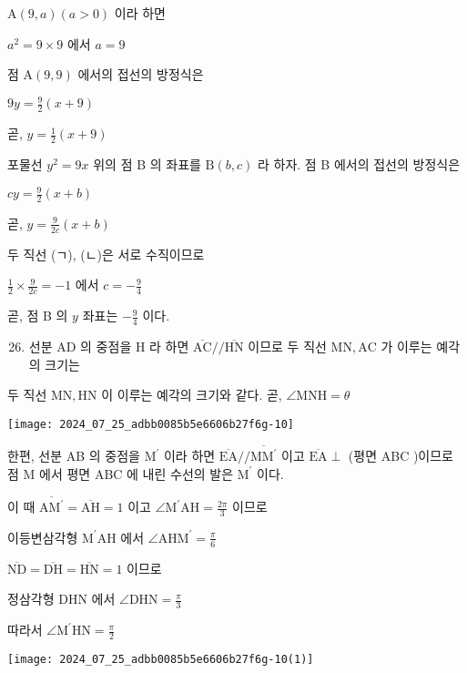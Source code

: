 \documentclass[10pt]{article}
\begin{document}
$\mathrm{A}(9, a)(a>0)$ 이라 하면

$a^{2}=9 \times 9$ 에서 $a=9$

점 $\mathrm{A}(9,9)$ 에서의 접선의 방정식은

$9 y=\frac{9}{2}(x+9)$

곧, $y=\frac{1}{2}(x+9)$

포물선 $y^{2}=9 x$ 위의 점 B 의 좌표를 $\mathrm{B}(b, c)$ 라 하자. 점 B 에서의 접선의 방정식은

$c y=\frac{9}{2}(x+b)$

곧, $y=\frac{9}{2 c}(x+b)$

두 직선 (ㄱ), (ㄴ)은 서로 수직이므로

$\frac{1}{2} \times \frac{9}{2 c}=-1$ 에서 $c=-\frac{9}{4}$

곧, 점 B 의 $y$ 좌표는 $-\frac{9}{4}$ 이다.

\begin{enumerate}
  \setcounter{enumi}{25}
  \item 선분 AD 의 중점을 H 라 하면 $\overline{\mathrm{AC}} / / \overline{\mathrm{HN}}$ 이므로 두 직선 $\mathrm{MN}, \mathrm{AC}$ 가 이루는 예각의 크기는
\end{enumerate}

두 직선 $\mathrm{MN}, \mathrm{HN}$ 이 이루는 예각의 크기와 같다. 곧, $\angle \mathrm{MNH}=\theta$

\begin{center}
\texttt{[image: 2024\_07\_25\_adbb0085b5e6606b27f6g-10]}
\end{center}

한편, 선분 AB 의 중점을 $\mathrm{M}^{\prime}$ 이라 하면 $\overline{\mathrm{EA}} / / \overline{\mathrm{MM}^{\prime}}$ 이고 $\overline{\mathrm{EA}} \perp$ (평면 ABC )이므로 점 M 에서 평면 ABC 에 내린 수선의 발은 $\mathrm{M}^{\prime}$ 이다.

이 때 $\overline{\mathrm{AM}^{\prime}}=\overline{\mathrm{AH}}=1$ 이고 $\angle \mathrm{M}^{\prime} \mathrm{AH}=\frac{2 \pi}{3}$ 이므로

이등변삼각형 $\mathrm{M}^{\prime} \mathrm{AH}$ 에서 $\angle \mathrm{AHM}^{\prime}=\frac{\pi}{6}$

$\overline{\mathrm{ND}}=\overline{\mathrm{DH}}=\overline{\mathrm{HN}}=1$ 이므로

정삼각형 DHN 에서 $\angle \mathrm{DHN}=\frac{\pi}{3}$

따라서 $\angle \mathrm{M}^{\prime} \mathrm{HN}=\frac{\pi}{2}$

\begin{center}
\texttt{[image: 2024\_07\_25\_adbb0085b5e6606b27f6g-10(1)]}
\end{center}
\end{document}
